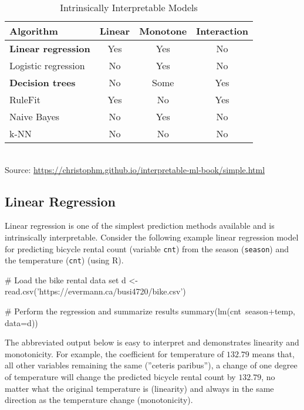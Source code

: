 \begin{table}
\centering
\renewcommand{\arraystretch}{1.1}

\begin{tabular}{lccc} \hline
Algorithm & Linear & Monotone & Interaction \\ \hline
\textbf{Linear regression} & Yes & Yes & No  \\ 
Logistic regression & No & Yes & No  \\
\textbf{Decision trees} & No & Some & Yes  \\
RuleFit & Yes & No & Yes  \\
Naive Bayes & No & Yes & No \\
k-NN & No & No & No  \\ \hline
\end{tabular} \\
\vspace{.5\baselineskip}
\scriptsize Source: \url{https://christophm.github.io/interpretable-ml-book/simple.html}\normalsize

\caption{Intrinsically Interpretable Models}
\label{tab:intrinsicmodels}
\end{table}

\subsection{Linear Regression}

Linear regression is one of the simplest prediction methods available and is intrinsically interpretable. Consider the following example linear regression model for predicting bicycle rental count (variable \texttt{cnt}) from the season (\texttt{season}) and the temperature (\texttt{cnt}) (using R).

\begin{Rcode}
# Load the bike rental data set
d <- read.csv('https://evermann.ca/busi4720/bike.csv')

# Perform the regression and summarize results
summary(lm(cnt~season+temp, data=d))
\end{Rcode}

The abbreviated output below is easy to interpret and demonstrates linearity and  monotonicity. For example, the coefficient for temperature of $132.79$ means that, all other variables remaining the same (''ceteris paribus''), a change of one degree of temperature will change the predicted bicycle rental count by $132.79$, no matter what the original temperature is (linearity) and always in the same direction as the temperature change (monotonicity). 

